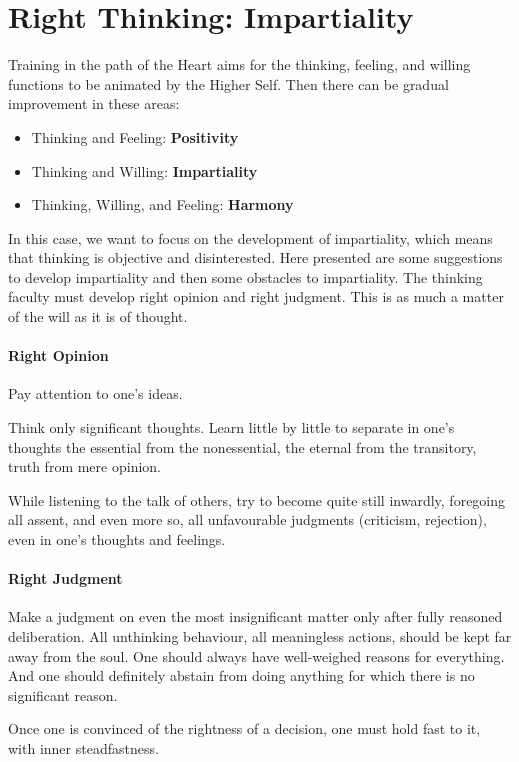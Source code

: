 \section{Right Thinking: Impartiality}

Training in the path of the Heart aims for the thinking, feeling, and willing functions to be animated by the Higher Self. Then there can be gradual improvement in these areas:

\begin{itemize}
\item Thinking and Feeling: \textbf{Positivity} 
\item Thinking and Willing: \textbf{Impartiality} 
\item Thinking, Willing, and Feeling: \textbf{Harmony} 
\end{itemize}
In this case, we want to focus on the development of impartiality, which means that thinking is objective and disinterested. Here presented are some suggestions to develop impartiality and then some obstacles to impartiality. The thinking faculty must develop right opinion and right judgment. This is as much a matter of the will as it is of thought.

\paragraph{Right Opinion}
Pay attention to one's ideas.

Think only significant thoughts. Learn little by little to separate in one's thoughts the essential from the nonessential, the eternal from the transitory, truth from mere opinion.

While listening to the talk of others, try to become quite still inwardly, foregoing all assent, and even more so, all unfavourable judgments (criticism, rejection), even in one's thoughts and feelings.

\paragraph{Right Judgment}
Make a judgment on even the most insignificant matter only after fully reasoned deliberation. All unthinking behaviour, all meaningless actions, should be kept far away from the soul. One should always have well-weighed reasons for everything. And one should definitely abstain from doing anything for which there is no significant reason.

Once one is convinced of the rightness of a decision, one must hold fast to it, with inner steadfastness.


